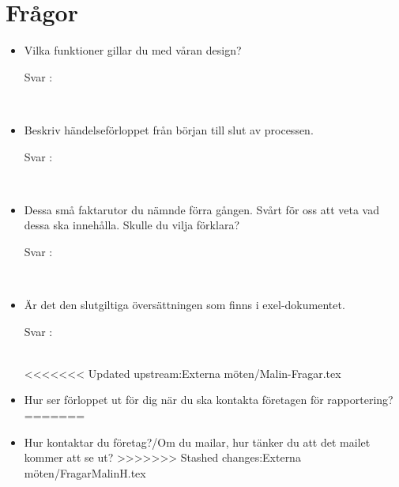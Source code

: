 \documentclass{article}
\date {#1}
\title {
    \documentTitle {Helsingborg Event and Convention Bureau}
    
    \documentDate {}
}
\begin{document}
\maketitle
\thispagestyle{empty}

\newpage




\newpage

\section{Frågor}

 
\begin{itemize}
 \item Vilka funktioner gillar du med våran design?
        \begin{description}
            \item[Svar :]
        \end{description}
    \\
    \item Beskriv händelseförloppet från början till slut av processen.
        \begin{description}
            \item[Svar :]
        \end{description}
    \\
    \item Dessa små faktarutor du nämnde förra gången. Svårt för oss att veta vad dessa ska innehålla. Skulle du vilja förklara?
        \begin{description}
            \item[Svar :]
        \end{description}  
    \\
     \item Är det den slutgiltiga översättningen som finns i exel-dokumentet.
        \begin{description}
            \item[Svar :]
        \end{description}
    \\
<<<<<<< Updated upstream:Externa möten/Malin-Fragar.tex
    \item Hur ser förloppet ut för dig när du ska kontakta företagen för rapportering? 
=======
    \item Hur kontaktar du företag?/Om du mailar, hur tänker du att det mailet kommer att se ut?
>>>>>>> Stashed changes:Externa möten/FragarMalinH.tex
    

\end{itemize}
\end{document}
